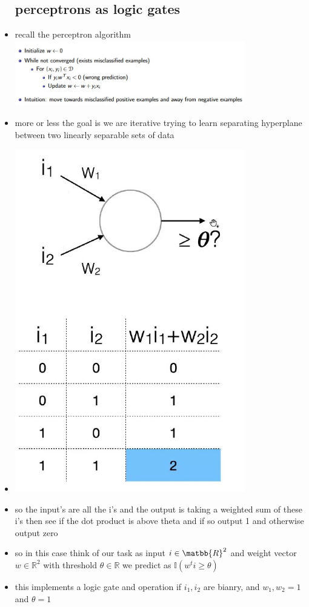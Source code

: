\documentclass{article}
\begin{document}
\begin{itemize}
\subsection{perceptrons as logic gates}
\item recall the perceptron algorithm \\ \includegraphics[width=10cm]{lecture_notes/lecture_11/immages/l11_1.jpg}
\item more or less the goal is we are iterative trying to learn separating hyperplane between two linearly separable sets of data
\item \includegraphics[width=10cm]{lecture_notes/lecture_11/immages/l11_2.jpg}
\item so the input's are all the i's and the output is taking a weighted sum of these i's then see if the dot product is above theta and if so output 1 and otherwise output zero
\item so in this case think of our task as input $i\in \matbb{R}^{2}$ and weight vector $w\in\mathbb{R}^2$ with threshold $\theta \in \mathbb{R}$
we predict as $\mathbb{I}(w^ti\geq \theta)$
\item this implements a logic gate and operation if $i_1, i_2$ are bianry, and $w_1, w_2=1$ and $\theta=1$

\end{itemize}
\end{document}
